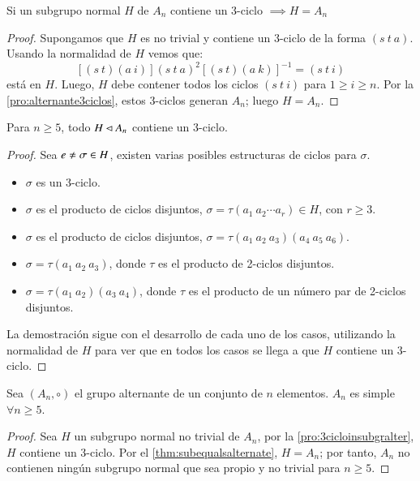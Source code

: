 \begin{thm}
	\label{thm:subequalsalternate}
	Si un subgrupo normal $H$ de $A_n$ contiene un 3-ciclo $\implies H = A_n$
\end{thm}
\begin{proof}
	Supongamos que $H$ es no trivial y contiene un 3-ciclo de la forma $(s\ t\ a)$. Usando la normalidad de $H$ vemos que:
	\[
	[(s\ t)(a\ i)](s\ t\ a)^2[(s\ t)(a\ k)]^{-1} = (s\ t\ i)
	\]
	está en $H$. Luego, $H$ debe contener todos los ciclos $(s\ t\ i)$ para $1 \geq i \geq n$. Por la \autoref{pro:alternante3ciclos}, estos 3-ciclos generan $A_n$; luego $H = A_n$.
\end{proof}
\begin{pro}
	\label{pro:3cicloinsubgralter}
	Para $n\geq 5$, todo $H \lhd A_n$ contiene un 3-ciclo.
\end{pro}
\begin{proof}
	Sea $e \not \eq \sigma \in H$, existen varias posibles estructuras de ciclos para $\sigma$.
	\begin{itemize}
		\item $\sigma$ es un 3-ciclo.
		\item $\sigma$ es el producto de ciclos disjuntos, $\sigma = \tau(a_1\ a_2 \cdots a_r)\in H$, con $r\geq 3$.
		\item $\sigma$ es el producto de ciclos disjuntos, $\sigma = \tau(a_1\ a_2\ a_3)(a_4\ a_5\ a_6)$.
		\item $\sigma = \tau(a_1\ a_2\ a_3)$, donde $\tau$ es el producto de 2-ciclos disjuntos.
		\item $\sigma = \tau(a_1\ a_2)(a_3\ a_4)$, donde $\tau$ es el producto de un número par de 2-ciclos disjuntos.
	\end{itemize}
	La demostración sigue con el desarrollo de cada uno de los casos, utilizando la normalidad de $H$ para ver que en todos los casos se llega a que $H$ contiene un 3-ciclo.
\end{proof}
\begin{thm}
	Sea $(A_n, \circ)$ el grupo alternante de un conjunto de $n$ elementos. $A_n$ es simple $\forall n \geq 5$.
\end{thm}
\begin{proof}
	Sea $H$ un subgrupo normal no trivial de $A_n$, por la  \autoref{pro:3cicloinsubgralter}, $H$ contiene un 3-ciclo. Por el  \autoref{thm:subequalsalternate}, $H = A_n$; por tanto, $A_n$ no contienen ningún subgrupo normal que sea propio y no trivial para $n\geq 5$.
\end{proof}

